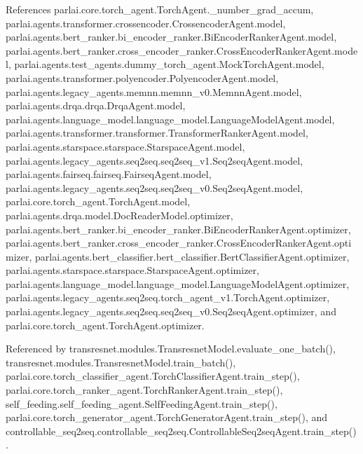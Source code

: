 References parlai.\+core.\+torch\+\_\+agent.\+Torch\+Agent.\+\_\+number\+\_\+grad\+\_\+accum, parlai.\+agents.\+transformer.\+crossencoder.\+Crossencoder\+Agent.\+model, parlai.\+agents.\+bert\+\_\+ranker.\+bi\+\_\+encoder\+\_\+ranker.\+Bi\+Encoder\+Ranker\+Agent.\+model, parlai.\+agents.\+bert\+\_\+ranker.\+cross\+\_\+encoder\+\_\+ranker.\+Cross\+Encoder\+Ranker\+Agent.\+model, parlai.\+agents.\+test\+\_\+agents.\+dummy\+\_\+torch\+\_\+agent.\+Mock\+Torch\+Agent.\+model, parlai.\+agents.\+transformer.\+polyencoder.\+Polyencoder\+Agent.\+model, parlai.\+agents.\+legacy\+\_\+agents.\+memnn.\+memnn\+\_\+v0.\+Memnn\+Agent.\+model, parlai.\+agents.\+drqa.\+drqa.\+Drqa\+Agent.\+model, parlai.\+agents.\+language\+\_\+model.\+language\+\_\+model.\+Language\+Model\+Agent.\+model, parlai.\+agents.\+transformer.\+transformer.\+Transformer\+Ranker\+Agent.\+model, parlai.\+agents.\+starspace.\+starspace.\+Starspace\+Agent.\+model, parlai.\+agents.\+legacy\+\_\+agents.\+seq2seq.\+seq2seq\+\_\+v1.\+Seq2seq\+Agent.\+model, parlai.\+agents.\+fairseq.\+fairseq.\+Fairseq\+Agent.\+model, parlai.\+agents.\+legacy\+\_\+agents.\+seq2seq.\+seq2seq\+\_\+v0.\+Seq2seq\+Agent.\+model, parlai.\+core.\+torch\+\_\+agent.\+Torch\+Agent.\+model, parlai.\+agents.\+drqa.\+model.\+Doc\+Reader\+Model.\+optimizer, parlai.\+agents.\+bert\+\_\+ranker.\+bi\+\_\+encoder\+\_\+ranker.\+Bi\+Encoder\+Ranker\+Agent.\+optimizer, parlai.\+agents.\+bert\+\_\+ranker.\+cross\+\_\+encoder\+\_\+ranker.\+Cross\+Encoder\+Ranker\+Agent.\+optimizer, parlai.\+agents.\+bert\+\_\+classifier.\+bert\+\_\+classifier.\+Bert\+Classifier\+Agent.\+optimizer, parlai.\+agents.\+starspace.\+starspace.\+Starspace\+Agent.\+optimizer, parlai.\+agents.\+language\+\_\+model.\+language\+\_\+model.\+Language\+Model\+Agent.\+optimizer, parlai.\+agents.\+legacy\+\_\+agents.\+seq2seq.\+torch\+\_\+agent\+\_\+v1.\+Torch\+Agent.\+optimizer, parlai.\+agents.\+legacy\+\_\+agents.\+seq2seq.\+seq2seq\+\_\+v0.\+Seq2seq\+Agent.\+optimizer, and parlai.\+core.\+torch\+\_\+agent.\+Torch\+Agent.\+optimizer.



Referenced by transresnet.\+modules.\+Transresnet\+Model.\+evaluate\+\_\+one\+\_\+batch(), transresnet.\+modules.\+Transresnet\+Model.\+train\+\_\+batch(), parlai.\+core.\+torch\+\_\+classifier\+\_\+agent.\+Torch\+Classifier\+Agent.\+train\+\_\+step(), parlai.\+core.\+torch\+\_\+ranker\+\_\+agent.\+Torch\+Ranker\+Agent.\+train\+\_\+step(), self\+\_\+feeding.\+self\+\_\+feeding\+\_\+agent.\+Self\+Feeding\+Agent.\+train\+\_\+step(), parlai.\+core.\+torch\+\_\+generator\+\_\+agent.\+Torch\+Generator\+Agent.\+train\+\_\+step(), and controllable\+\_\+seq2seq.\+controllable\+\_\+seq2seq.\+Controllable\+Seq2seq\+Agent.\+train\+\_\+step().

